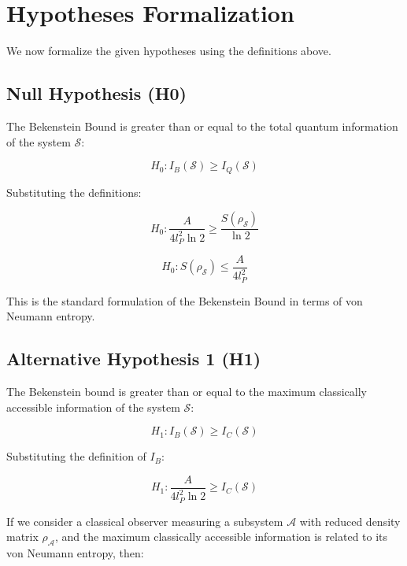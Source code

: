 \documentclass{article}
\begin{document}
	\section{Hypotheses Formalization}
	
	We now formalize the given hypotheses using the definitions above.
	
	\subsection{Null Hypothesis (H0)}
	
	The Bekenstein Bound is greater than or equal to the total quantum information of the system $\mathcal{S}$:
	
	\begin{equation*}
		H_0: I_B(\mathcal{S}) \ge I_Q(\mathcal{S})
	\end{equation*}
	
	Substituting the definitions:
	
	\begin{equation*}
		H_0: \frac{A}{4 l_P^2 \ln 2} \ge \frac{S(\rho_{\mathcal{S}})}{\ln 2}
	\end{equation*}
	
	\begin{equation*}
		H_0: S(\rho_{\mathcal{S}}) \le \frac{A}{4 l_P^2}
	\end{equation*}
	
	This is the standard formulation of the Bekenstein Bound in terms of von Neumann entropy.
	
	\subsection{Alternative Hypothesis 1 (H1)}
	
	The Bekenstein bound is greater than or equal to the maximum classically accessible information of the system $\mathcal{S}$:
	
	\begin{equation*}
		H_1: I_B(\mathcal{S}) \ge I_C(\mathcal{S})
	\end{equation*}
	
	Substituting the definition of $I_B$:
	
	\begin{equation*}
		H_1: \frac{A}{4 l_P^2 \ln 2} \ge I_C(\mathcal{S})
	\end{equation*}
	
	If we consider a classical observer measuring a subsystem $\mathcal{A}$ with reduced density matrix $\rho_{\mathcal{A}}$, and the maximum classically accessible information is related to its von Neumann entropy, then:
	
\end{document}
